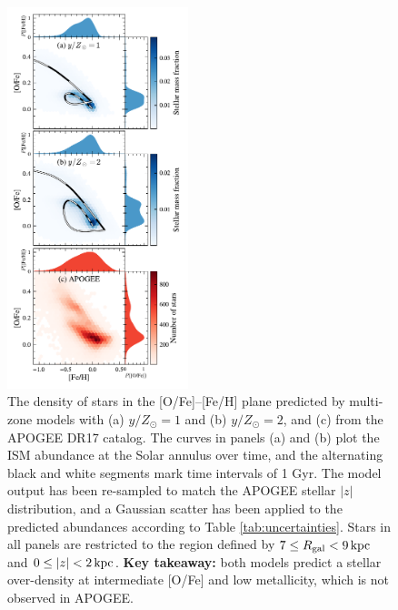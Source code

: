 \documentclass[twocolumn,twocolappendix,linenumbers]{aastex631}
\newcommand{\kpc}{\,{\rm kpc}}
\newcommand{\onecolumn}{0.47\textwidth}
\begin{document}
\begin{figure}
    \centering
    \includegraphics[width=\onecolumn]{figures/ofe_feh_density.pdf}
    \caption{The density of stars in the [O/Fe]--[Fe/H] plane predicted by multi-zone models with (a) $y/Z_\odot=1$ and (b) $y/Z_\odot=2$, and (c) from the APOGEE DR17 catalog. The curves in panels (a) and (b) plot the ISM abundance at the Solar annulus over time, and the alternating black and white segments mark time intervals of {1 Gyr}. The model output has been re-sampled to match the APOGEE stellar $|z|$ distribution, and a Gaussian scatter has been applied to the predicted abundances according to Table \ref{tab:uncertainties}. Stars in all panels are restricted to the region defined by $7\leq R_{\rm gal}< 9\kpc$ and $0\leq|z|<2\kpc$. {\bf Key takeaway:} both models predict a stellar over-density at intermediate [O/Fe] and low metallicity, which is not observed in APOGEE.}

\end{figure}
\end{document}

